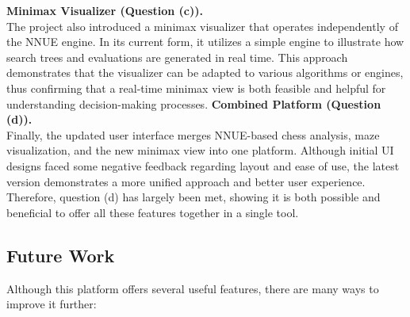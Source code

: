 \documentclass[12pt,a4paper]{article}
\begin{document}
\vspace{0.5em}
\noindent
\textbf{Minimax Visualizer (Question (c)).} \\
The project also introduced a minimax visualizer that operates independently of
the NNUE engine. In its current form, it utilizes a simple engine to illustrate
how search trees and evaluations are generated in real time. This approach
demonstrates that the visualizer can be adapted to various algorithms or engines,
thus confirming that a real-time minimax view is both feasible and helpful for
understanding decision-making processes.
\vspace{0.5em}
\noindent
\textbf{Combined Platform (Question (d)).} \\
Finally, the updated user interface merges NNUE-based chess analysis, maze
visualization, and the new minimax view into one platform. Although initial UI
designs faced some negative feedback regarding layout and ease of use, the
latest version demonstrates a more unified approach and better user experience.
Therefore, question (d) has largely been met, showing it is both possible and
beneficial to offer all these features together in a single tool.
\subsection{Future Work}

Although this platform offers several useful features, there are many ways to
improve it further:
\end{document}
